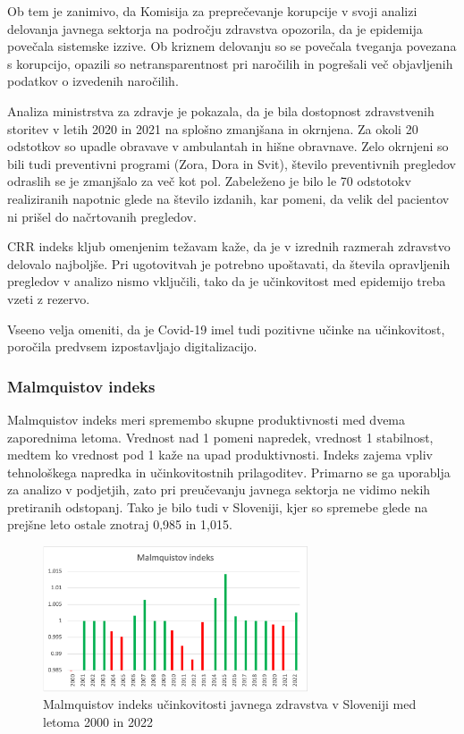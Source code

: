 \documentclass[12pt,a4paper]{article}
\theoremstyle{definition}
\begin{document}
Ob tem je zanimivo, da Komisija za preprečevanje korupcije v svoji analizi delovanja javnega sektorja na področju zdravstva opozorila, da je epidemija povečala sistemske izzive. 
Ob kriznem delovanju so se povečala tveganja povezana s korupcijo, opazili so netransparentnost pri naročilih in pogrešali več objavljenih podatkov o izvedenih naročilih. 
\cite{analizaJavnegaZdravstva2023} 

Analiza ministrstva za zdravje je pokazala, da je bila dostopnost zdravstvenih storitev v letih 2020 in 2021 na splošno zmanjšana in okrnjena. 
Za okoli 20 odstotkov so upadle obravave v ambulantah in hišne obravnave. Zelo okrnjeni so bili tudi preventivni programi (Zora, Dora in Svit), število preventivnih pregledov odraslih se je zmanjšalo za več kot pol. 
Zabeleženo je bilo le 70 odstotokv realiziranih napotnic glede na število izdanih, kar pomeni, da velik del pacientov ni prišel do načrtovanih pregledov. \cite{jamsek2022analiza}

CRR indeks kljub omenjenim težavam kaže, da je v izrednih razmerah zdravstvo delovalo najboljše. Pri ugotovitvah je potrebno upoštavati, da števila opravljenih pregledov v analizo nismo vključili, tako da je učinkovitost med epidemijo treba vzeti z rezervo.

Vseeno velja omeniti, da je Covid-19 imel tudi pozitivne učinke na učinkovitost, poročila predvsem izpostavljajo digitalizacijo.


\subsubsection{Malmquistov indeks}
Malmquistov indeks meri spremembo skupne produktivnosti med dvema zaporednima letoma. 
Vrednost nad 1 pomeni napredek, vrednost 1 stabilnost, medtem ko vrednost pod 1 kaže na upad produktivnosti. 
Indeks zajema vpliv tehnološkega napredka in učinkovitostnih prilagoditev. Primarno se ga uporablja za analizo v podjetjih, 
zato pri preučevanju javnega sektorja ne vidimo nekih pretiranih odstopanj. 
Tako je bilo tudi v Sloveniji, kjer so spremebe glede na prejšne leto ostale znotraj 0,985 in 1,015.

\begin{figure}[H]
    \centering
    \includegraphics[width=0.7\textwidth]{malmq_ind_slo.png}
    \caption{Malmquistov indeks učinkovitosti javnega zdravstva v Sloveniji med letoma 2000 in 2022}
    \label{fig:malmq_ind_slo.png}
\end{figure}

\nocite*{}


\end{document}
